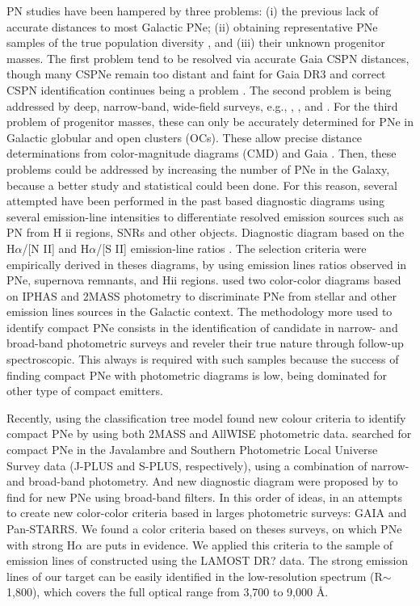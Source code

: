 \documentclass[fleqn,usenatbib]{mnras}
\begin{document}
PN studies have been hampered by three problems:
(i) the previous lack of accurate distances to most Galactic
PNe; (ii) obtaining representative PNe samples of the true
population diversity \citep{Parker:2022}, and (iii) their unknown
progenitor masses. The first problem tend to be
resolved via accurate Gaia CSPN distances, though many
CSPNe remain too distant and faint for Gaia DR3 and correct
CSPN identification continues being a problem \citep{Parker:2022}.
The second problem is being addressed by deep, narrow-band,
wide-field surveys, e.g., \citet{Parker:2005},
\citet{Drew:2005}, and \citet{Drew:2014}. For the third problem
of progenitor masses, these can only be accurately determined for
PNe in Galactic globular and open clusters (OCs). These allow precise
distance determinations from color-magnitude diagrams (CMD) and Gaia
\citep{Fragkou:2022}. Then, these problems could be addressed by increasing the
number of PNe in the Galaxy, because a better study and statistical
could been done. For this reason, several attempted have been performed
in the past based diagnostic diagrams using several emission-line
intensities to differentiate resolved emission
sources such as PN from H {\sc ii} regions, SNRs and other objects.
Diagnostic diagram based on the H{$\alpha$}/[N II] and H{$\alpha$}/[S II]
emission-line ratios \citep{Sabbadin:1977, Fesen:1985, Riesgo:2006}.
The selection criteria were empirically derived in theses diagrams,
by using emission lines ratios observed in PNe, supernova remnants, and H{\sc ii}
regions. \citet{Viironen:2009a, Viironen:2009b} used two color-color diagrams
based on IPHAS and 2MASS photometry to discriminate PNe from stellar and other
emission lines sources in the Galactic context. The methodology more used to
identify compact PNe consists in the identification of candidate in narrow- and
broad-band photometric surveys and reveler their true nature through follow-up
spectroscopic. This always is required with such samples because the success
of finding compact PNe with photometric diagrams is low, being dominated for
other type of compact emitters.

Recently, \citet{Akras:2019b} using the classification tree model
found new colour criteria to identify compact PNe by
using both 2MASS and AllWISE photometric data. \citet{Gutierrez-Soto:2020}
searched for compact PNe in the Javalambre and Southern Photometric Local
Universe Survey data (J-PLUS and S-PLUS, respectively), using a combination
of narrow- and broad-band photometry. And new diagnostic diagram were proposed
by \citet{Vejar:2019} to find for new PNe using broad-band filters.
In this order of ideas, in an attempts to create new color-color criteria based
in larges photometric surveys: GAIA and Pan-STARRS. We found a color criteria
based on theses surveys, on which PNe with strong H{$\alpha$} are puts in
evidence. We applied this criteria to the sample of emission lines of \citet{Skoda:2020}
constructed using the LAMOST DR? data. The strong emission lines of our target can
be easily identiﬁed in the low-resolution spectrum (R$\sim$1,800), which covers
the full optical range from 3,700 to 9,000 \AA.
\end{document}
